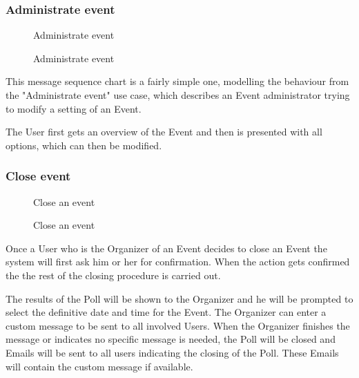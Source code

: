 	\subsubsection{Administrate event}
		\begin{figure}[H]
			\centering
			\begin{msc}{Administrate event}

				\nextlevel
				\nextlevel
				\nextlevel
			\end{msc}
			\caption{Administrate event}
			\label{msc:adminevent}
		\end{figure}

		This message sequence chart is a fairly simple one, modelling the behaviour from the "Administrate event" use case, which describes an Event administrator trying to modify a setting of an Event.

		The User first gets an overview of the Event and then is presented with all options, which can then be modified.

	\subsubsection{Close event}
		\begin{figure}[H]
			\centering
			\begin{msc}{Close an event}

				\nextlevel
				\nextlevel
				\nextlevel

				\nextlevel
				\nextlevel
				\nextlevel
				\nextlevel
				\nextlevel
				\nextlevel
				\nextlevel
			\end{msc}
			\caption{Close an event}
			\label{msc:closeevent}
		\end{figure}
 
		Once a User who is the Organizer of an Event decides to close an Event the system will first ask him or her for confirmation. When the action gets confirmed the the rest of the closing procedure is carried out.

		The results of the Poll will be shown to the Organizer and he will be prompted to select the definitive date and time for the Event. The Organizer can enter a custom message to be sent to all involved Users. When the Organizer finishes the message or indicates no specific message is needed, the Poll will be closed and Emails will be sent to all users indicating the closing of the Poll. These Emails will contain the custom message if available.
